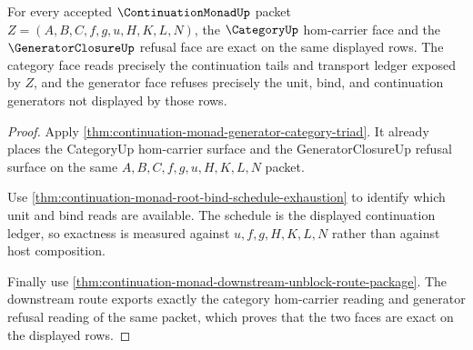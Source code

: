 \begin{theorem}
\label{thm:continuation-monad-category-generator-exactness}
For every accepted $\ContinuationMonadUp$ packet $Z=(A,B,C,f,g,u,H,K,L,N)$, the $\CategoryUp$ hom-carrier face and the $\GeneratorClosureUp$ refusal face are exact on the same displayed rows. The category face reads precisely the continuation tails and transport ledger exposed by $Z$, and the generator face refuses precisely the unit, bind, and continuation generators not displayed by those rows.
\end{theorem}
\begin{proof}
Apply \autoref{thm:continuation-monad-generator-category-triad}. It already places the CategoryUp hom-carrier surface and the GeneratorClosureUp refusal surface on the same $A,B,C,f,g,u,H,K,L,N$ packet.

Use \autoref{thm:continuation-monad-root-bind-schedule-exhaustion} to identify which unit and bind reads are available. The schedule is the displayed continuation ledger, so exactness is measured against $u,f,g,H,K,L,N$ rather than against host composition.

Finally use \autoref{thm:continuation-monad-downstream-unblock-route-package}. The downstream route exports exactly the category hom-carrier reading and generator refusal reading of the same packet, which proves that the two faces are exact on the displayed rows.
\end{proof}

